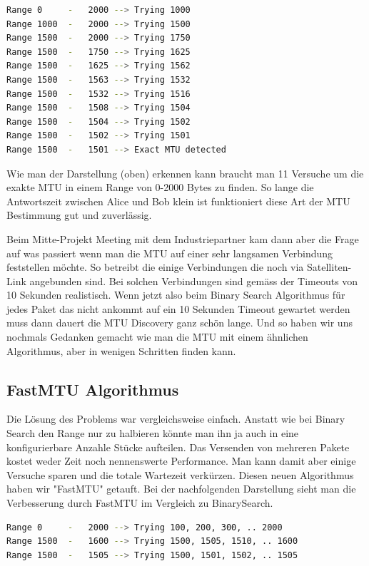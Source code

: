 \begin{lstlisting}[language=bash, caption=MTU Discovery in Binary Search]                    
Range 0		-	2000 --> Trying 1000
Range 1000	-	2000 --> Trying 1500
Range 1500	-	2000 --> Trying 1750
Range 1500	-	1750 --> Trying 1625
Range 1500	-	1625 --> Trying 1562
Range 1500 	-	1563 --> Trying 1532
Range 1500	-	1532 --> Trying 1516
Range 1500	-	1508 --> Trying 1504
Range 1500	- 	1504 --> Trying 1502
Range 1500	-	1502 --> Trying 1501
Range 1500 	- 	1501 --> Exact MTU detected
\end{lstlisting}

Wie man der Darstellung (oben) erkennen kann braucht man 11 Versuche um die exakte \ac{MTU} in einem Range von 0-2000 Bytes zu finden. So lange die Antwortszeit zwischen Alice und Bob klein ist funktioniert diese Art der \ac{MTU} Bestimmung gut und zuverlässig.

Beim Mitte-Projekt Meeting mit dem Industriepartner kam dann aber die Frage auf was passiert wenn man die \ac{MTU} auf einer sehr langsamen Verbindung feststellen möchte. So betreibt die \osag einige Verbindungen die noch via Satelliten-Link angebunden sind. Bei solchen Verbindungen sind gemäss der \osag Timeouts von 10 Sekunden realistisch. Wenn jetzt also beim Binary Search Algorithmus für jedes Paket das nicht ankommt auf ein 10 Sekunden Timeout gewartet werden muss dann dauert die \ac{MTU} Discovery ganz schön lange. Und so haben wir uns nochmals Gedanken gemacht wie man die \ac{MTU} mit einem ähnlichen Algorithmus, aber in wenigen Schritten finden kann.

\subsection{FastMTU Algorithmus}
Die Lösung des Problems war vergleichsweise einfach. Anstatt wie bei Binary Search den Range nur zu halbieren könnte man ihn ja auch in eine konfigurierbare Anzahle Stücke aufteilen. Das Versenden von mehreren Pakete kostet weder Zeit noch nennenswerte Performance. Man kann damit aber einige Versuche sparen und die totale Wartezeit verkürzen. Diesen neuen Algorithmus haben wir "FastMTU" getauft. Bei der nachfolgenden Darstellung sieht man die Verbesserung durch FastMTU im Vergleich zu BinarySearch.

\begin{lstlisting}[language=bash, caption=FastMTU Discovery]                    
Range 0		-	2000 --> Trying 100, 200, 300, .. 2000
Range 1500	-	1600 --> Trying 1500, 1505, 1510, .. 1600
Range 1500	-	1505 --> Trying 1500, 1501, 1502, .. 1505
\end{lstlisting}

